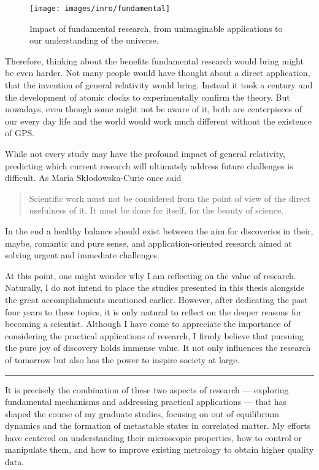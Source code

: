 \begin{figure}
	\centering
	\texttt{[image: images/inro/fundamental]}
	\caption{Impact of fundamental research, from unimaginable applications to our understanding of the universe.}
	\label{fig:fundamental}
\end{figure}


Therefore, thinking about the benefits fundamental research would bring might be even harder.
Not many people would have thought about a direct application, that the invention of general relativity would bring.
Instead it took a century and the development of atomic clocks to experimentally confirm the theory.
But nowadays, even though some might not be aware of it, both are centerpieces of our every day life and the world would work much different without the existence of GPS.

While not every study may have the profound impact of general relativity, predicting which current research will ultimately address future challenges is difficult.
As Maria Skłodowska-Curie once said
\begin{quote} 
	\centering 
	 Scientific work must not be considered from the point of view of the direct usefulness of it. It must be done for itself, for the beauty of science.
\end{quote}
In the end a healthy balance should exist between the aim for discoveries in their, maybe, romantic and pure sense, and application-oriented research aimed at solving urgent and immediate challenges.

At this point, one might wonder why I am reflecting on the value of research.
Naturally, I do not intend to place the studies presented in this thesis alongside the great accomplishments mentioned earlier.
However, after dedicating the past four years to these topics, it is only natural to reflect on the deeper reasons for becoming a scientist.
Although I have come to appreciate the importance of considering the practical applications of research, I firmly believe that pursuing the pure joy of discovery holds immense value.
It not only influences the research of tomorrow but also has the power to inspire society at large.

\begin{center}
	\rule{0.3\textwidth}{.8pt}
\end{center}

It is precisely the combination of these two aspects of research — exploring fundamental mechanisms and addressing practical applications — that has shaped the course of my graduate studies, focusing on out of equilibrium dynamics and the formation of metastable states in correlated matter.
My efforts have centered on understanding their microscopic properties, how to control or manipulate them, and how to improve existing metrology to obtain higher quality data.

